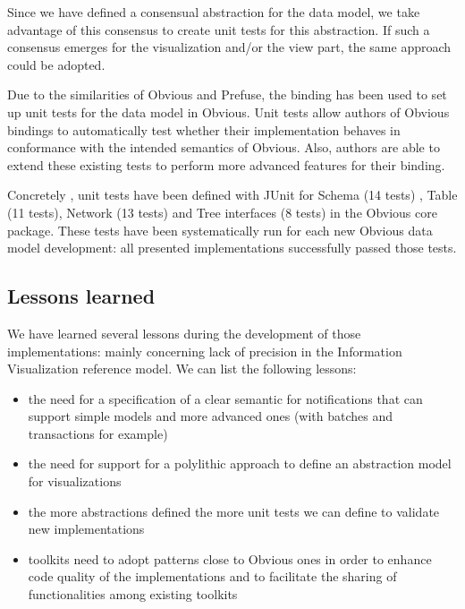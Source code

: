 Since we have defined a consensual abstraction for the data model, we take advantage of this consensus to create unit tests for this abstraction. If such a consensus emerges for the visualization and/or the view part, the same approach could be adopted.

Due to the similarities of Obvious and Prefuse, the binding has been used to set up unit tests for the data model in Obvious. Unit tests allow authors of Obvious bindings to automatically test whether their implementation behaves in conformance with the intended semantics of Obvious. Also, authors are able to extend these existing tests to perform more advanced features for their binding.

Concretely , unit tests have been defined with JUnit  for Schema (14 tests) , Table (11 tests), Network (13 tests) and Tree interfaces (8 tests) in the Obvious core package. These tests have been systematically run for each new Obvious data model development: all presented implementations successfully passed those tests.

\subsection{Lessons learned}

We have learned several lessons during the development of those implementations: mainly concerning lack of precision in the Information Visualization reference model. We can list the following lessons:

\begin{itemize}
\item the need for a specification of a clear semantic for notifications that can support simple models and more advanced ones (with batches and transactions for example)
\item the need for support for a polylithic approach to define an abstraction model for visualizations
\item the more abstractions defined the more unit tests we can define to validate new implementations
\item toolkits need to adopt patterns close to Obvious ones in order to enhance code quality of the implementations and to facilitate the sharing of functionalities among existing toolkits
\end{itemize}



